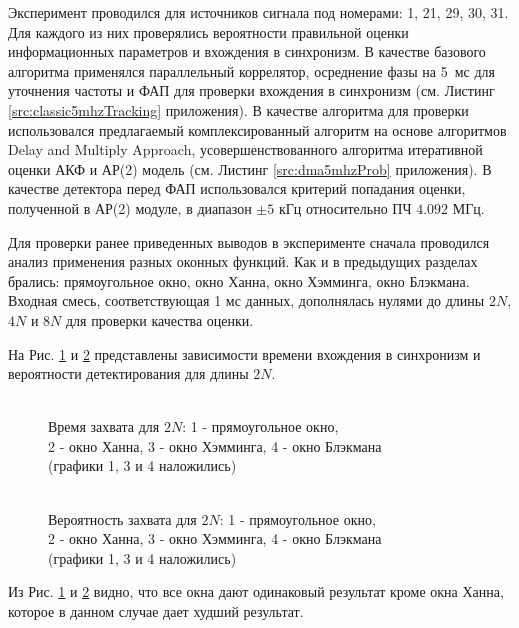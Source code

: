 Эксперимент проводился для источников сигнала под номерами: 1, 21, 29, 30, 31. Для каждого из них проверялись вероятности правильной оценки информационных параметров и вхождения в синхронизм.
В качестве базового алгоритма применялся параллельный коррелятор, осреднение фазы на \mbox{5 мс} для уточнения частоты и ФАП для проверки вхождения в синхронизм
(см. Листинг \ref{src:classic5mhzTracking} приложения). В качестве алгоритма для проверки
использовался предлагаемый комплексированный алгоритм на основе алгоритмов Delay and Multiply Approach, усовершенствованного алгоритма итеративной оценки АКФ и
АР(2) модель (см. Листинг \ref{src:dma5mhzProb} приложения).
В качестве детектора перед ФАП использовался критерий попадания оценки, полученной в АР(2) модуле, в диапазон ${\pm 5}$ кГц относительно ПЧ ${4.092}$ МГц. 

Для проверки ранее приведенных выводов в эксперименте сначала проводился анализ применения разных оконных функций. Как и в предыдущих разделах брались: прямоугольное окно,
окно Ханна, окно Хэмминга, окно Блэкмана. Входная смесь, соответствующая 1 мс данных, дополнялась нулями до длины ${2N}$, ${4N}$ и ${8N}$ для проверки качества
оценки.

На Рис. \ref{pic:dma5mhz_2fft_lockTime} и \ref{pic:dma5mhz_2fft_probDetection} представлены зависимости времени вхождения в синхронизм и вероятности детектирования для длины ${2N}$.
\begin{figure}[h]
\center{}
	\caption{\\Время захвата для ${2N}$: 1 - прямоугольное окно,\\2 - окно Ханна, 3 - окно Хэмминга, 4 - окно Блэкмана\\(графики 1, 3 и 4 наложились)}
	\label{pic:dma5mhz_2fft_lockTime}
\end{figure}
\begin{figure}[h]
\center{}
	\caption{\\Вероятность захвата для ${2N}$: 1 - прямоугольное окно,\\2 - окно Ханна, 3 - окно Хэмминга, 4 - окно Блэкмана\\(графики 1, 3 и 4 наложились)}
	\label{pic:dma5mhz_2fft_probDetection}
\end{figure}
Из Рис. \ref{pic:dma5mhz_2fft_lockTime} и \ref{pic:dma5mhz_2fft_probDetection} видно, что все окна дают одинаковый результат кроме окна Ханна, которое в данном случае дает худший результат.

